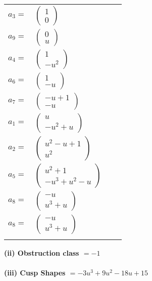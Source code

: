 \documentclass[1p]{elsarticle_modified}
\theoremstyle{definition}
\begin{document}
\begin{tabular}{m{7pt} m{180pt} m{7pt} m{180pt} }
\flushright $a_{3}=$&$\begin{pmatrix}1\\0\end{pmatrix}$ \\
\flushright $a_{9}=$&$\begin{pmatrix}0\\u\end{pmatrix}$ \\
\flushright $a_{4}=$&$\begin{pmatrix}1\\- u^2\end{pmatrix}$ \\
\flushright $a_{6}=$&$\begin{pmatrix}1\\- u\end{pmatrix}$ \\
\flushright $a_{7}=$&$\begin{pmatrix}- u+1\\- u\end{pmatrix}$ \\
\flushright $a_{1}=$&$\begin{pmatrix}u\\- u^2+u\end{pmatrix}$ \\
\flushright $a_{2}=$&$\begin{pmatrix}u^2- u+1\\u^2\end{pmatrix}$ \\
\flushright $a_{5}=$&$\begin{pmatrix}u^2+1\\- u^3+u^2- u\end{pmatrix}$ \\
\flushright $a_{8}=$&$\begin{pmatrix}- u\\u^3+u\end{pmatrix}$\\ \flushright $a_{8}=$&$\begin{pmatrix}- u\\u^3+u\end{pmatrix}$\\&\end{tabular}
\flushleft \textbf{(ii) Obstruction class $= -1$}\\~\\
\flushleft \textbf{(iii) Cusp Shapes $= -3 u^3+9 u^2-18 u+15$}\\~\\
\end{document}
